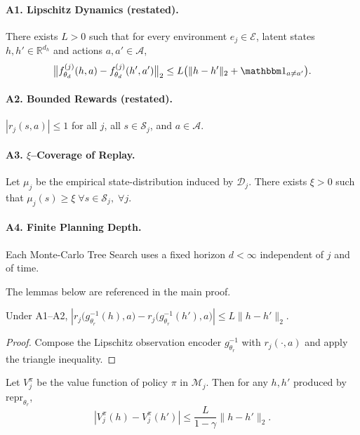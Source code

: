 \paragraph{A1. Lipschitz Dynamics (restated).}
There exists $L>0$ such that for every environment
$e_j\!\in\!\mathcal E$, latent states $h,h'\!\in\!\mathbb R^{d_h}$ and
actions $a,a'\!\in\!\mathcal A$,
\[
\bigl\lVert
  f_{\theta_d}^{(j)}(h,a)-f_{\theta_d}^{(j)}(h',a')
\bigr\rVert_2
\le
L\bigl(\lVert h-h'\rVert_2+\mathbbm1_{a\neq a'}\bigr).
\]

\paragraph{A2. Bounded Rewards (restated).}
$|r_j(s,a)|\le 1$ for all $j$, all $s\!\in\!\mathcal S_j$, and
$a\!\in\!\mathcal A$.

\paragraph{A3. $\xi$–Coverage of Replay.}
Let $\mu_j$ be the empirical state-distribution induced by $\mathcal D_j$.
There exists $\xi>0$ such that
$\mu_j(s)\ge\xi\;\forall s\!\in\!\mathcal S_j,\; \forall j$.

\paragraph{A4. Finite Planning Depth.}
Each Monte-Carlo Tree Search uses a fixed horizon $d<\infty$ independent of
$j$ and of time.

\medskip
The lemmas below are referenced in the main proof.

\begin{lemma}\label{lem:lip-reward}
Under A1–A2,
$|r_j\!\bigl(g_{\theta_r}^{-1}(h),a\bigr)
          -r_j\!\bigl(g_{\theta_r}^{-1}(h'),a\bigr)|
\le L\lVert h-h'\rVert_2.$
\end{lemma}

\begin{proof}
Compose the Lipschitz observation encoder $g_{\theta_r}^{-1}$ with
$r_j(\cdot,a)$ and apply the triangle inequality.
\end{proof}

\begin{lemma}\label{lem:lip-value}
Let $V^{\pi}_j$ be the value function of policy $\pi$ in $\mathcal M_j$.
Then for any $h,h'$ produced by $\mathrm{repr}_{\theta_r}$,
\[
|V^{\pi}_j(h)-V^{\pi}_j(h')|
\le
\frac{L}{1-\gamma}\lVert h-h'\rVert_2 .
\]
\end{lemma}

